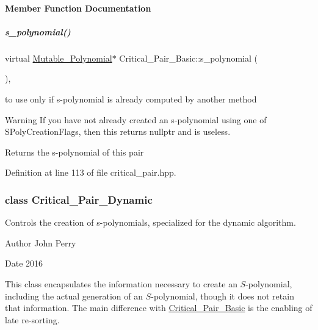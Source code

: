 \paragraph{Member Function Documentation}
\mbox{\label{group___g_b_computation_ab2dbac89b07b2acfad633a9de8f56fab}} 
\subparagraph{\texorpdfstring{s\+\_\+polynomial()}{s\_polynomial()}}
{\footnotesize\ttfamily virtual \hyperlink{group__polygroup_class_mutable___polynomial}{Mutable\+\_\+\+Polynomial}$\ast$ Critical\+\_\+\+Pair\+\_\+\+Basic\+::s\+\_\+polynomial (\begin{DoxyParamCaption}{ }\end{DoxyParamCaption})\hspace{0.3cm}{\ttfamily [inline]}, {\ttfamily [virtual]}}



to use only if s-\/polynomial is already computed by another method 

\begin{DoxyWarning}{Warning}
If you have not already created an s-\/polynomial using one of S\+Poly\+Creation\+Flags, then this returns {\ttfamily nullptr} and is useless. 
\end{DoxyWarning}
\begin{DoxyReturn}{Returns}
the s-\/polynomial of this pair 
\end{DoxyReturn}


Definition at line 113 of file critical\+\_\+pair.\+hpp.

\label{class_critical___pair___dynamic}
\subsubsection{class Critical\+\_\+\+Pair\+\_\+\+Dynamic}
Controls the creation of s-\/polynomials, specialized for the dynamic algorithm. 

\begin{DoxyAuthor}{Author}
John Perry 
\end{DoxyAuthor}
\begin{DoxyDate}{Date}
2016
\end{DoxyDate}
This class encapsulates the information necessary to create an $S$-\/polynomial, including the actual generation of an $S$-\/polynomial, though it does not retain that information. The main difference with {\ttfamily \hyperlink{group___g_b_computation_class_critical___pair___basic}{Critical\+\_\+\+Pair\+\_\+\+Basic}} is the enabling of late re-\/sorting. 

